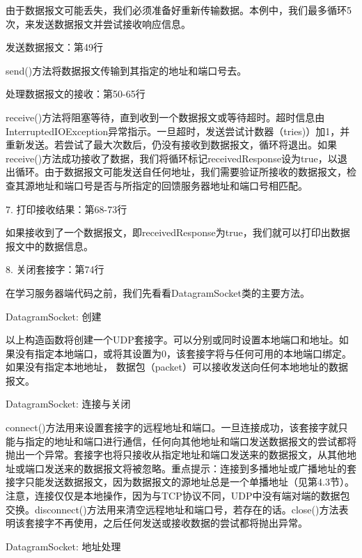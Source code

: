 		由于数据报文可能丢失，我们必须准备好重新传输数据。本例中，我们最多循环5次，来发送数据报文并尝试接收响应信息。 

		发送数据报文：第49行 

		send()方法将数据报文传输到其指定的地址和端口号去。 

		处理数据报文的接收：第50-65行 

		receive()方法将阻塞等待，直到收到一个数据报文或等待超时。超时信息由InterruptedIOException异常指示。一旦超时，发送尝试计数器（tries)）加1，并重新发送。若尝试了最大次数后，仍没有接收到数据报文，循环将退出。如果receive()方法成功接收了数据，我们将循环标记receivedResponse设为true，以退出循环。由于数据报文可能发送自任何地址，我们需要验证所接收的数据报文，检查其源地址和端口号是否与所指定的回馈服务器地址和端口号相匹配。 

		7. 打印接收结果：第68-73行 

		如果接收到了一个数据报文，即receivedResponse为true，我们就可以打印出数据报文中的数据信息。 

		8. 关闭套接字：第74行 

		在学习服务器端代码之前，我们先看看DatagramSocket类的主要方法。 

		DatagramSocket: 创建 

		

		以上构造函数将创建一个UDP套接字。可以分别或同时设置本地端口和地址。如果没有指定本地端口，或将其设置为0，该套接字将与任何可用的本地端口绑定。如果没有指定本地地址， 数据包（packet）可以接收发送向任何本地地址的数据报文。 

		DatagramSocket: 连接与关闭 

		
		 
		connect()方法用来设置套接字的远程地址和端口。一旦连接成功，该套接字就只能与指定的地址和端口进行通信，任何向其他地址和端口发送数据报文的尝试都将抛出一个异常。套接字也将只接收从指定地址和端口发送来的数据报文，从其他地址或端口发送来的数据报文将被忽略。重点提示：连接到多播地址或广播地址的套接字只能发送数据报文，因为数据报文的源地址总是一个单播地址（见第4.3节）。注意，连接仅仅是本地操作，因为与TCP协议不同，UDP中没有端对端的数据包交换。disconnect()方法用来清空远程地址和端口号，若存在的话。close()方法表明该套接字不再使用，之后任何发送或接收数据的尝试都将抛出异常。 

		DatagramSocket: 地址处理 

		

